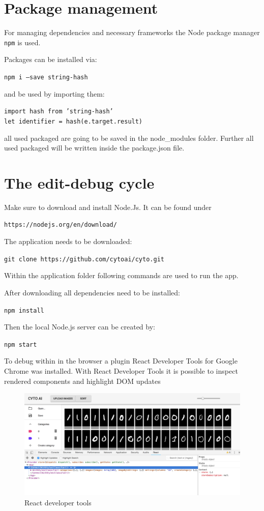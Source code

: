\section{Package management}
For managing dependencies and necessary frameworks the Node 
package manager \texttt{npm} is used. 

Packages can be installed via:

	\texttt{npm i ---save string-hash}

and be used by importing them:

	\texttt{import hash from 'string-hash'} \\
	\texttt{let identifier = hash(e.target.result)}

all used packaged are going to be saved in the node\_modules
folder. Further all used packaged will be written inside the
package.json file.


\section{The edit-debug cycle}

Make sure to download and install Node.Js. It can be found under

\texttt{https://nodejs.org/en/download/}

The application needs to be downloaded:

\texttt{git clone https://github.com/cytoai/cyto.git}

Within the application folder following commands are used to
run the app.

After downloading all dependencies need to be installed:

\texttt{npm install}

Then the local Node.js server can be created by:

\texttt{npm start}

To debug within in the browser a plugin React Developer Tools
for Google Chrome was installed. With React Developer Tools
it is possible to inspect rendered components and highlight DOM updates 

\begin{figure}[H]
	\centering
	\includegraphics[width=0.9\linewidth]{bilder/cyto/ReactDebug.png}
	\caption{React developer tools}
	\label{fig:Developer Tools}
\end{figure}


